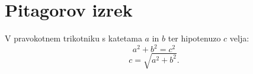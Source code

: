 \documentclass{article}
\begin{document}
\section*{Pitagorov izrek}
V pravokotnem trikotniku s katetama \(a\) in \(b\) ter hipotenuzo \(c\) velja:
\[ a^2 + b^2 = c^2\]
\[ c = \sqrt{a^2 + b^2}.\]
\end{document}

